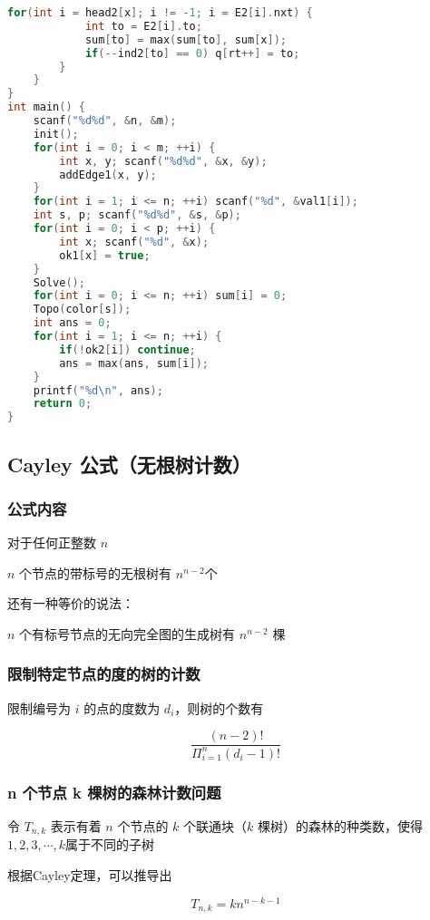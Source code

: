 \begin{lstlisting}[language=C++]
        for(int i = head2[x]; i != -1; i = E2[i].nxt) {
            int to = E2[i].to;
            sum[to] = max(sum[to], sum[x]);
            if(--ind2[to] == 0) q[rt++] = to;
        }
    }
}
int main() {
    scanf("%d%d", &n, &m);
    init();
    for(int i = 0; i < m; ++i) {
        int x, y; scanf("%d%d", &x, &y);
        addEdge1(x, y);
    }
    for(int i = 1; i <= n; ++i) scanf("%d", &val1[i]);
    int s, p; scanf("%d%d", &s, &p);
    for(int i = 0; i < p; ++i) {
        int x; scanf("%d", &x);
        ok1[x] = true;
    }
    Solve();
    for(int i = 0; i <= n; ++i) sum[i] = 0;
    Topo(color[s]);
    int ans = 0;
    for(int i = 1; i <= n; ++i) {
        if(!ok2[i]) continue;
        ans = max(ans, sum[i]);
    }
    printf("%d\n", ans);
    return 0;
}
\end{lstlisting}

\subsection{Cayley 公式（无根树计数）}

\subsubsection{公式内容}

对于任何正整数 $n$

$n$ 个节点的带标号的无根树有 $n^{n − 2}$个

还有一种等价的说法：

$n$ 个有标号节点的无向完全图的生成树有 $n^{n − 2}$ 棵

\subsubsection{限制特定节点的度的树的计数}

限制编号为 $i$ 的点的度数为 $d_ {i}$，则树的个数有

$$\frac{(n - 2)!}{\Pi_{i = 1} ^ {n} (d_{i} - 1)!}$$

\subsubsection{n 个节点 k 棵树的森林计数问题}

令 $T _ {n, k}$ 表示有着 $n$ 个节点的 $k$ 个联通块（$k$ 棵树）的森林的种类数，使得$1, 2, 3, \cdots, k$属于不同的子树

根据Cayley定理，可以推导出

$$T_{n, k} = k n^{n − k - 1}$$

